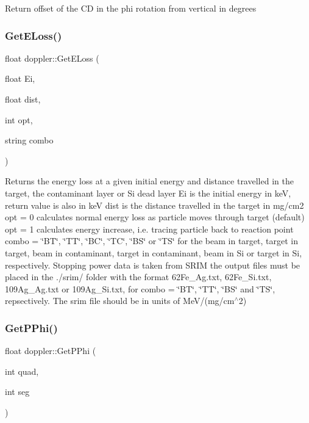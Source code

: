Return offset of the CD in the phi rotation from vertical in degrees \mbox{\label{classdoppler_a64570ec784dabd6e17cf836489450527}} 
\subsubsection{\texorpdfstring{Get\+E\+Loss()}{GetELoss()}}
{\footnotesize\ttfamily float doppler\+::\+Get\+E\+Loss (\begin{DoxyParamCaption}\item[{float}]{Ei,  }\item[{float}]{dist,  }\item[{int}]{opt,  }\item[{string}]{combo }\end{DoxyParamCaption})}

Returns the energy loss at a given initial energy and distance travelled in the target, the contaminant layer or Si dead layer Ei is the initial energy in keV, return value is also in keV dist is the distance travelled in the target in mg/cm2 opt = 0 calculates normal energy loss as particle moves through target (default) opt = 1 calculates energy increase, i.\+e. tracing particle back to reaction point combo = \char`\"{}\+B\+T\char`\"{}, \char`\"{}\+T\+T\char`\"{}, \char`\"{}\+B\+C\char`\"{}, \char`\"{}\+T\+C\char`\"{}, \char`\"{}\+B\+S\char`\"{} or \char`\"{}\+T\+S\char`\"{} for the beam in target, target in target, beam in contaminant, target in contaminant, beam in Si or target in Si, respectively. Stopping power data is taken from S\+R\+IM the output files must be placed in the \textquotesingle{}./srim/\textquotesingle{} folder with the format 62\+Fe\+\_\+Ag.\+txt, 62\+Fe\+\_\+\+Si.\+txt, 109\+Ag\+\_\+Ag.\+txt or 109\+Ag\+\_\+\+Si.\+txt, for combo = \char`\"{}\+B\+T\char`\"{}, \char`\"{}\+T\+T\char`\"{}, \char`\"{}\+B\+S\char`\"{} and \char`\"{}\+T\+S\char`\"{}, repsectively. The srim file should be in units of Me\+V/(mg/cm$^\wedge$2) \mbox{\label{classdoppler_a0f57a8f4a8c369c14d52e62dd3833f2e}} 
\subsubsection{\texorpdfstring{Get\+P\+Phi()}{GetPPhi()}\hspace{0.1cm}{\footnotesize\ttfamily [1/2]}}
{\footnotesize\ttfamily float doppler\+::\+Get\+P\+Phi (\begin{DoxyParamCaption}\item[{int}]{quad,  }\item[{int}]{seg }\end{DoxyParamCaption})}

